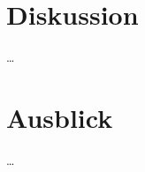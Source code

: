 \chapter{Diskussion} %
\label{sec:diskussion}

\ldots

\chapter{Ausblick} %
\label{sec:ausblick}

\ldots

